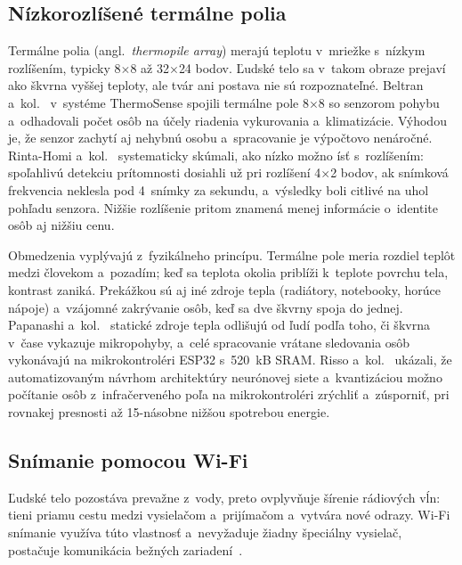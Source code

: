 \documentclass[10pt,twoside,a4paper]{article}
\begin{document}
\subsection{Nízkorozlíšené termálne polia}

Termálne polia (angl.~\emph{thermopile array}) merajú teplotu v~mriežke s~nízkym rozlíšením, typicky 8$\times$8 až 32$\times$24 bodov. Ľudské telo sa v~takom obraze prejaví ako škvrna vyššej teploty, ale tvár ani postava nie sú rozpoznateľné. Beltran a~kol.~\cite{beltran2013thermosense} v~systéme ThermoSense spojili termálne pole 8$\times$8 so senzorom pohybu a~odhadovali počet osôb na účely riadenia vykurovania a~klimatizácie. Výhodou je, že senzor zachytí aj nehybnú osobu a~spracovanie je výpočtovo nenáročné. Rinta-Homi a~kol.~\cite{rintahomi2021howlow} systematicky skúmali, ako nízko možno ísť s~rozlíšením: spoľahlivú detekciu prítomnosti dosiahli už pri rozlíšení 4$\times$2 bodov, ak snímková frekvencia neklesla pod 4~snímky za sekundu, a~výsledky boli citlivé na uhol pohľadu senzora. Nižšie rozlíšenie pritom znamená menej informácie o~identite osôb aj nižšiu cenu.

Obmedzenia vyplývajú z~fyzikálneho princípu. Termálne pole meria rozdiel teplôt medzi človekom a~pozadím; keď sa teplota okolia priblíži k~teplote povrchu tela, kontrast zaniká. Prekážkou sú aj iné zdroje tepla (radiátory, notebooky, horúce nápoje) a~vzájomné zakrývanie osôb, keď sa dve škvrny spoja do jednej. Papanashi a~kol.~\cite{papanashi2026thermal} statické zdroje tepla odlišujú od ľudí podľa toho, či škvrna v~čase vykazuje mikropohyby, a~celé spracovanie vrátane sledovania osôb vykonávajú na mikrokontroléri ESP32 s~520~kB SRAM. Risso a~kol.~\cite{risso2024hwsw} ukázali, že automatizovaným návrhom architektúry neurónovej siete a~kvantizáciou možno počítanie osôb z~infračerveného poľa na mikrokontroléri zrýchliť a~zúsporniť, pri rovnakej presnosti až 15-násobne nižšou spotrebou energie.

\subsection{Snímanie pomocou Wi-Fi}

Ľudské telo pozostáva prevažne z~vody, preto ovplyvňuje šírenie rádiových vĺn: tieni priamu cestu medzi vysielačom a~prijímačom a~vytvára nové odrazy. Wi-Fi snímanie využíva túto vlastnosť a~nevyžaduje žiadny špeciálny vysielač, postačuje komunikácia bežných zariadení~\cite{shahbazian2023survey}.
\end{document}
